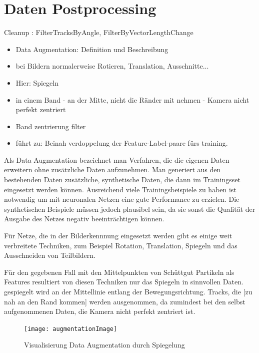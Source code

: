 


\section{Daten Postprocessing}

Cleanup : FilterTracksByAngle, FilterByVectorLengthChange 

\color{blue}
\begin{itemize}
	\item Data Augmentation: Definition und Beschreibung
	\item bei Bildern normalerweise Rotieren, Translation, Ausschnitte...
	\item Hier: Spiegeln
	\item in einem Band - an der Mitte, nicht die Ränder mit nehmen - Kamera nicht perfekt zentriert
	\item Band zentrierung filter
	\item führt zu: Beinah verdoppelung der Feature-Label-paare fürs training.
\end{itemize}
\color{black}

Als Data Augmentation bezeichnet man Verfahren, die die eigenen Daten erweitern ohne zusätzliche Daten aufzunehmen.
Man generiert aus den bestehenden Daten zusätzliche, synthetische Daten, die dann im Trainingsset eingesetzt werden können.
Ausreichend viele Trainingsbeispiele zu haben ist notwendig um mit neuronalen Netzen eine gute Performance zu erzielen.
Die synthetischen Beispiele müssen jedoch plausibel sein, da sie sonst die Qualität der Ausgabe des Netzes negativ beeinträchtigen können.

Für Netze, die in der Bilderkennnung eingesetzt werden gibt es einige weit verbreitete Techniken,
zum Beispiel Rotation, Translation, Spiegeln und das Ausschneiden von Teilbildern.

Für den gegebenen Fall mit den Mittelpunkten von Schüttgut Partikeln als Features resultiert von diesen Techniken nur das Spiegeln in sinnvollen Daten.
gespiegelt wird an der Mittellinie entlang der Bewegungsrichtung.
Tracks, die [zu nah an den Rand kommen] werden ausgenommen, da zumindest bei den selbst aufgenommenen Daten, die Kamera nicht perfekt zentriert ist.

\begin{figure}[h]
	\centering
	\texttt{[image: augmentationImage]}
	\caption{Visualisierung Data Augmentation durch Spiegelung}
	\label{fig:dataAugm}
\end{figure}



